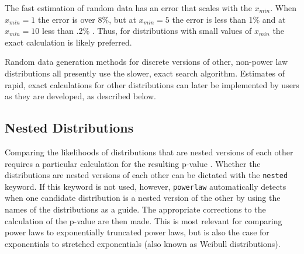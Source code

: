 \documentclass[10pt]{article}
\begin{document}
 The fast estimation of random data has an error that scales with the $x_{min}$. When $x_{min}=1$ the error is over 8\%, but at $x_{min}=5$ the error is less than 1\% and at $x_{min}=10$ less than .2\% \cite{Clauset2009}. Thus, for distributions with small values of $x_{min}$ the exact calculation is likely preferred. %
 
 Random data generation methods for discrete versions of other, non-power law distributions all presently use the slower, exact search algorithm. Estimates of rapid, exact calculations for other distributions can later be implemented by users as they are developed, as described below.%
 
 \subsection*{Nested Distributions}
 Comparing the likelihoods of distributions that are nested versions of each other requires a particular calculation for the resulting p-value \cite{Clauset2009}. Whether the distributions are nested versions of each other can be dictated with the \verb$nested$ keyword. If this keyword is not used, however, \verb$powerlaw$ automatically detects when one candidate distribution is a nested version of the other by using the names of the distributions as a guide. The appropriate corrections to the calculation of the p-value are then made. This is most relevant for comparing power laws to exponentially truncated power laws, but is also the case for exponentials to stretched exponentials (also known as Weibull distributions). 
 
\end{document}
